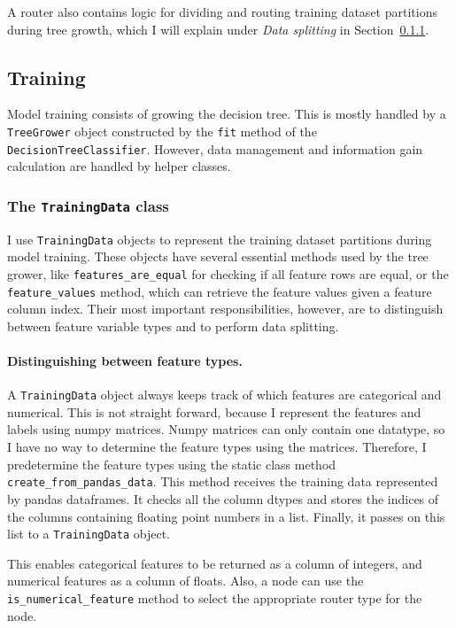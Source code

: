 \documentclass{article}
\begin{document}
A router also contains logic for dividing and routing training dataset partitions during tree growth,
which I will explain under \emph{Data splitting} in Section~\ref{sec:the-trainingdata-class}.

\subsection{Training}

Model training consists of growing the decision tree.
This is mostly handled by a \texttt{TreeGrower} object constructed by the \texttt{fit} method of the \texttt{DecisionTreeClassifier}.
However, data management and information gain calculation are handled
by helper classes.

\subsubsection{The \texttt{TrainingData} class}
\label{sec:the-trainingdata-class}

I use \texttt{TrainingData} objects to represent the training dataset partitions during model training.
These objects have several essential methods used by the tree grower, like \texttt{features\_are\_equal} for checking if all feature rows are equal,
or the \texttt{feature\_values} method, which can retrieve the feature values given a feature column index. 
Their most important responsibilities, however, are to distinguish between feature variable types and to perform data splitting.

\paragraph{Distinguishing between feature types.}
A \texttt{TrainingData} object always keeps track of which features are categorical and numerical.
This is not straight forward, because I represent the features and labels using numpy matrices.
Numpy matrices can only contain one datatype, so I have no way to determine the feature types using the matrices.
Therefore, I predetermine the feature types using the static class method \texttt{create\_from\_pandas\_data}.
This method receives the training data represented by pandas dataframes.
It checks all the column dtypes and stores the indices of the columns
containing floating point numbers in a list.
Finally, it passes on this list to a \texttt{TrainingData} object.

This enables categorical features to be returned as a column of integers, and numerical features as a column of floats.
Also, a node can use the \texttt{is\_numerical\_feature} method to select the appropriate router type for the node.
\end{document}
